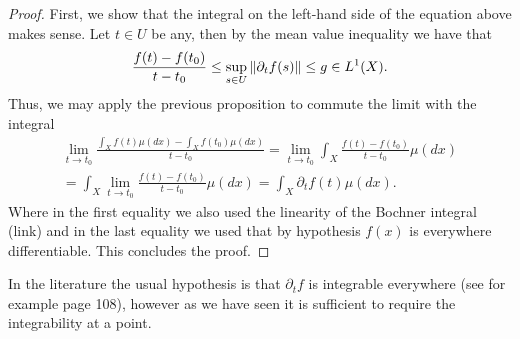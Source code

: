 \documentclass[12pt]{article}
\begin{document}
\begin{proof}
	First, we show that the integral on the left-hand side of the equation above makes sense. Let $t\in U$ be any, then by the mean value inequality we have that
	\begin{equation*}
		\frac{f(t)-f(t_0)}{t-t_0}\leq \sup_{s \in U}\norm{\partial _t f(s)}\leq g \in L^1(X).
	\end{equation*}
	Thus, we may apply the previous proposition to commute the limit with the integral
	\begin{multline*}
		\lim_{t \to t_0}\frac{\int_{X} f(t)\mu (dx)-\int_{X}f(t_0) \mu (dx)}{t-t_0}  =\lim_{t \to t_0}\int_{X}    \frac{f(t)-f(t_0)}{t-t_0} \mu (dx) \\=\int_{X}\lim_{t \to t_0} \frac{f(t)-f(t_0)}{t-t_0} \mu (dx) =\int_{X}\partial _t f(t) \mu(dx).
	\end{multline*}
	Where in the first equality we also used the linearity of the Bochner integral (link) and in the last equality we used that by hypothesis $f(x)$ is everywhere differentiable. This concludes the proof.
\end{proof}
In the literature the usual hypothesis is that $\partial _t f$ is integrable everywhere (see for example \cite{FF} page 108), however as we have seen it is sufficient to require the integrability at a point.
\end{document}
